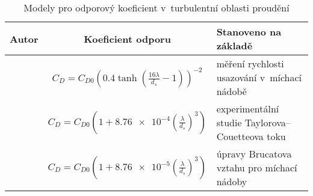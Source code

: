 \begin{table}[h!]
\begin{center}
  
		\hypertarget{hyp:cds}{}
		\caption{Modely pro odporový koeficient v~turbulentní oblasti proudění}
		\label{tab:cds}
\begin{tabular}{|c|c|>{\centering\arraybackslash}p{5cm}|}
  \hline
  
{\textbf{Autor}} & {\textbf{Koeficient odporu}} & {\textbf{Stanoveno na základě}} \\ \hline{}

\citet{pin01} & $C_{D} = C_{D0} \left( \num{0.4}\tanh\left(  \frac{16\lambda}{d_{s}} - 1  \right) \right) ^{-2}$ & měření rychlosti usazování v~míchací nádobě \\ \hline
 
\citet{bru98} & $C_{D} = C_{D0} \left( 1 + \num{8.76e-4} \left( \frac{\lambda}{d_{s}} \right)^{3} \right)$ & experimentální studie Taylorova–Couetteova toku \\ \hline 

\citet{kho06} & $C_{D} = C_{D0} \left( 1 + \num{8.76e-5} \left( \frac{\lambda}{d_{s}} \right)^{3} \right)$ & úpravy Brucatova vztahu pro míchací nádoby  \\ \hline 

\end{tabular}
\end{center}
\end{table}

\vspace{-9mm}








